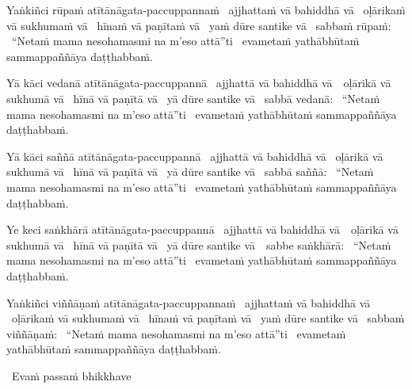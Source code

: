 \begin{pali-hang}
  Yaṅkiñci rūpaṁ atītānāgata-paccuppannaṁ \breathmark\ ajjhattaṁ vā bahiddhā vā \breathmark\ oḷārikaṁ vā sukhumaṁ vā \breathmark\ hīnaṁ vā paṇītaṁ vā \breathmark\ yaṁ dūre santike vā \breathmark\ sabbaṁ rūpaṁ: \breathmark\ ``Netaṁ mama nesohamasmi na m'eso attā''ti \breathmark\ evametaṁ yathābhūtaṁ sammappaññāya daṭṭhabbaṁ.
\end{pali-hang}

\begin{pali-hang}
  Yā kāci vedanā atītānāgata-paccuppannā \breathmark\ ajjhattā vā bahiddhā \mbox{vā}~\breathmark\ oḷārikā vā sukhumā vā \breathmark\ hīnā vā paṇītā vā \breathmark\ yā dūre santike vā \breathmark\ sabbā vedanā: \breathmark\ ``Netaṁ mama nesohamasmi na m'eso attā''ti \breathmark\ evametaṁ yathābhūtaṁ sammappaññāya daṭṭhabbaṁ.
\end{pali-hang}

\begin{pali-hang}
  Yā kāci saññā atītānāgata-paccuppannā \breathmark\ ajjhattā vā bahiddhā vā \breathmark\ oḷārikā vā sukhumā vā \breathmark\ hīnā vā paṇītā vā \breathmark\ yā dūre santike vā \breathmark\ sabbā saññā: \breathmark\ ``Netaṁ mama nesohamasmi na m'eso attā''ti \breathmark\ evametaṁ yathābhūtaṁ sammappaññāya daṭṭhabbaṁ.
\end{pali-hang}

\begin{pali-hang}
  Ye keci saṅkhārā atītānāgata-paccuppannā \breathmark\ ajjhattā vā bahiddhā \mbox{vā}~\breathmark\ oḷārikā vā sukhumā vā \breathmark\ hīnā vā paṇītā vā \breathmark\ yā dūre santike \mbox{vā}~\breathmark\ sabbe saṅkhārā: \breathmark\ ``Netaṁ mama nesohamasmi na m'eso attā''ti \breathmark\ evametaṁ yathābhūtaṁ sammappaññāya daṭṭhabbaṁ.
\end{pali-hang}

\begin{pali-hang}
  Yaṅkiñci viññāṇaṁ atītānāgata-paccuppannaṁ \breathmark\ ajjhattaṁ vā bahiddhā vā \breathmark\ oḷārikaṁ vā sukhumaṁ vā \breathmark\ hīnaṁ vā paṇītaṁ vā \breathmark\ yaṁ dūre santike vā \breathmark\ sabbaṁ viññāṇaṁ: \breathmark\ ``Netaṁ mama nesohamasmi na m'eso attā''ti \breathmark\ evametaṁ yathābhūtaṁ sammappaññāya daṭṭhabbaṁ.
\end{pali-hang}

\begin{leader-only}
  \anglebracketleft\ \hspace{-0.5mm}Evaṁ passaṁ bhikkhave \hspace{-0.5mm}\anglebracketright\
\end{leader-only}

